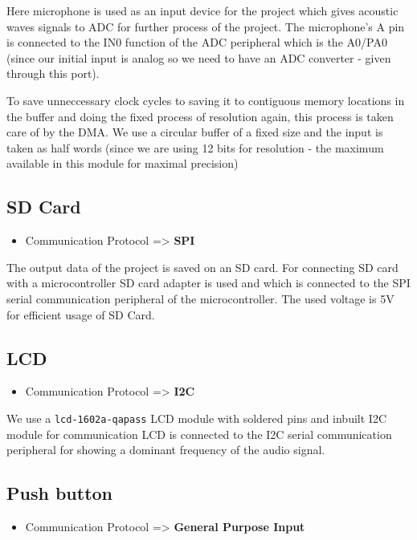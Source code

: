 \documentclass[11pt]{article}
\begin{document}
Here microphone is used as an input device for the project which gives acoustic waves signals to ADC for further process of the project. The microphone’s A pin is connected to the IN0 function of the ADC peripheral which is the A0/PA0 (since our initial input is analog so we need to have an ADC converter - given through this port).

To save unneccessary clock cycles to saving it to contiguous memory locations in the buffer and doing the fixed process of resolution again, this process is taken care of by the DMA. We use a circular buffer of a fixed size and the input is taken as half words (since we are using 12 bits for resolution - the maximum available in this module for maximal precision)


\subsection{SD Card}
\label{sec:orgfa59839}

\begin{itemize}
\item Communication Protocol => \textbf{SPI}
\end{itemize}

The output data of the project is saved on an SD card. For connecting SD card with a microcontroller SD card adapter is used and which is connected to the SPI serial communication peripheral of the microcontroller. The used voltage is 5V for efficient usage of SD Card.

\subsection{LCD}
\label{sec:org353e4a6}

\begin{itemize}
\item Communication Protocol => \textbf{I2C}
\end{itemize}

We use a \texttt{lcd-1602a-qapass} LCD module with soldered pins and inbuilt I2C module for communication
LCD is connected to the I2C serial communication peripheral for showing a dominant frequency of the audio signal.

\subsection{Push button}
\label{sec:org9b8f643}

\begin{itemize}
\item Communication Protocol => \textbf{General Purpose Input}
\end{itemize}
\end{document}
